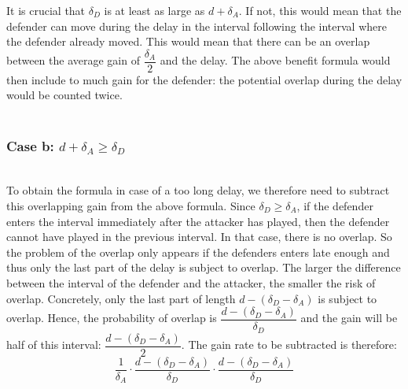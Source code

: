 \documentclass[master=cws, masteroption=vs,english]{kulemt}
\begin{document}
\begin{abstract*}
It is crucial that $ \delta_{D}$ is at least as large as $d + \delta_{A}$. If not, this would mean that the defender can move during the delay in the interval following the interval where the defender already moved. This would mean that there can be an overlap between the average gain of $\dfrac{\delta_{A}}{2}$ and the delay. The above benefit formula would then include to much gain for the defender: the potential overlap during the delay would be counted twice. \\


~~ \\
\subsubsection*{\textbf{Case b:} $d + \delta_{A} \geq \delta_{D}$}
~~~\\

To obtain the formula in case of a too long delay, we therefore need to subtract this overlapping gain from the above formula. 
Since $\delta_{D} \geq \delta_{A}$, if the defender enters the interval immediately after the attacker has played, then the defender cannot have played in the previous interval. In that case, there is no overlap. So the problem of the overlap only appears if the defenders enters late enough and thus only the last part of the delay is subject to overlap. The larger the difference between the interval of the defender and the attacker, the smaller the risk of overlap. Concretely, only the last part of length $d - (\delta_{D} - \delta_{A})$ is subject to overlap. Hence, the probability of overlap is $\dfrac{ d - (\delta_{D} - \delta_{A})}{\delta_{D}}$ and the gain will be half of this interval:  $\dfrac{ d - (\delta_{D} - \delta_{A})}{2}$.  The gain rate to be subtracted is therefore:\\

\begin{equation}\label{first}
\dfrac{1} {\delta_{A}} \cdot \dfrac{d - (\delta_{D} - \delta_{A})}{\delta_{D}} \cdot \dfrac{d - (\delta_{D} - \delta_{A})}{\delta_{D}}
\end{equation}


\end{abstract*}
\end{document}
